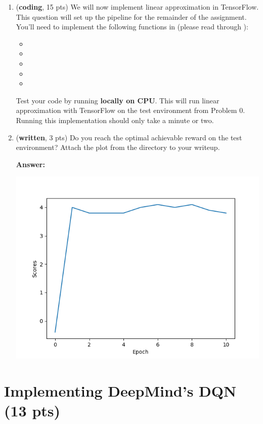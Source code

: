 \documentclass{article}
\begin{document}
\begin{enumerate}
 \item (\textbf{coding}, 15 pts) We will now implement linear approximation in TensorFlow. This question will set up the pipeline for the remainder of the assignment. You'll need to implement the following functions in  (please read through ):
\begin{itemize}
	\item {}
	\item {}
	\item {}
	\item {}
	\item {}
\end{itemize}
Test your code by running  \textbf{locally on CPU}.  This will run linear approximation with TensorFlow on the test environment from Problem 0.  Running this implementation should only take a minute or two.

 \item (\textbf{written}, 3 pts) Do you reach the optimal achievable reward on the test environment? Attach the plot  from the directory  to your writeup.

\textbf{Answer:}

\includegraphics[scale=0.75]{q2_scores}

\end{enumerate}


\section{Implementing DeepMind's DQN (13 pts)}
\end{document}
